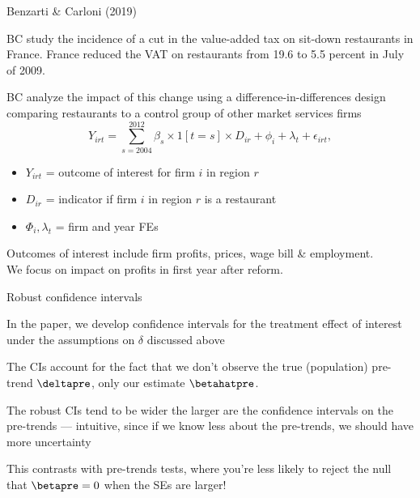 \documentclass[aspectratio = 169, 13pt]{beamer}
\begin{document}
\begin{frame}{Benzarti \& Carloni (2019)}
	\begin{wideitemize}
		\item
		BC study the incidence of a cut in the value-added tax on sit-down restaurants in France.
		France reduced the VAT on restaurants from 19.6 to 5.5 percent in July of 2009. 
		
		\item
		BC analyze the impact of this change using a difference-in-differences design comparing restaurants to a control group of other market services firms
		\vspace{-3mm}
		\begin{equation}
			Y_{irt} = \sum_{s = 2004}^{2012} \beta_s \times 1[t = s] \times  D_{ir} + \phi_i + \lambda_t + \epsilon_{irt} , \label{eqn: bc event-study spec}    
		\end{equation}
		\vspace{-3mm}
		\noindent 
    \begin{itemize}
      \item $Y_{irt}$ = outcome of interest for firm $i$ in region $r$
      \item $D_{ir}$ = indicator if firm $i$ in region $r$ is a restaurant
      \item $\Phi_i, \lambda_t$ = firm and year FEs
		\end{itemize}
		
		\item Outcomes of interest include firm profits, prices, wage bill \& employment.\\
		We focus on impact on profits in first year after reform.
	\end{wideitemize}
\end{frame}

\begin{frame}{Robust confidence intervals}
	\begin{wideitemize}
		\item
		In the paper, we develop confidence intervals for the treatment effect of interest under the assumptions on $\delta$ discussed above
		
		\item
		The CIs account for the fact that we don't observe the true (population) pre-trend $\deltapre$, only our estimate $\betahatpre$. 
		
		\item
		The robust CIs tend to be wider the larger are the confidence intervals on the pre-trends --- intuitive, since if we know less about the pre-trends, we should have more uncertainty
		
		\item
		This contrasts with pre-trends tests, where you're less likely to reject the null that $\betapre =0$ when the SEs are larger!
	\end{wideitemize}
\end{frame}
\end{document}
